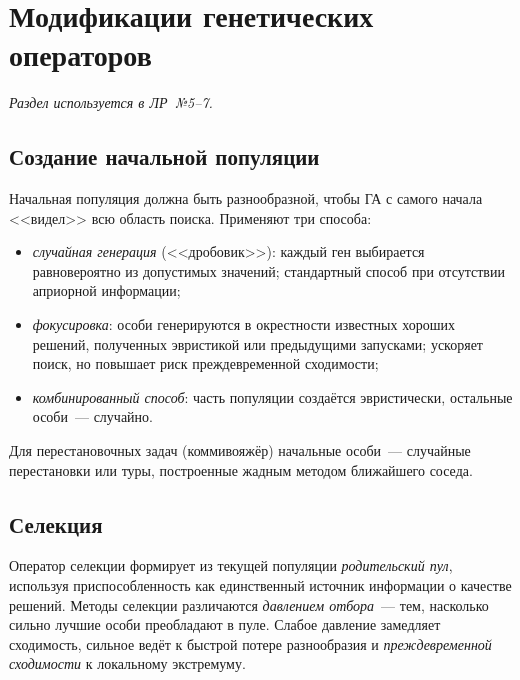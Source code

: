 \section{Модификации генетических операторов}
\label{sec:operators}

\noindent\hspace{1.25cm}\emph{Раздел используется в ЛР~№5--7.}

\subsection{Создание начальной популяции}

Начальная популяция должна быть разнообразной, чтобы ГА с самого начала <<видел>> всю область
поиска. Применяют три способа:
\begin{itemize}
\item \emph{случайная генерация} (<<дробовик>>): каждый ген выбирается равновероятно из допустимых
значений; стандартный способ при отсутствии априорной информации;
\item \emph{фокусировка}: особи генерируются в окрестности известных хороших решений, полученных
эвристикой или предыдущими запусками; ускоряет поиск, но повышает риск преждевременной сходимости;
\item \emph{комбинированный способ}: часть популяции создаётся эвристически, остальные особи~---
случайно.
\end{itemize}
Для перестановочных задач (коммивояжёр) начальные особи~--- случайные перестановки или туры,
построенные жадным методом ближайшего соседа.

\subsection{Селекция}

Оператор селекции формирует из текущей популяции \emph{родительский пул}, используя приспособленность
как единственный источник информации о качестве решений. Методы селекции различаются
\emph{давлением отбора}~--- тем, насколько сильно лучшие особи преобладают в пуле. Слабое давление
замедляет сходимость, сильное ведёт к быстрой потере разнообразия и \emph{преждевременной сходимости}
к локальному экстремуму.

